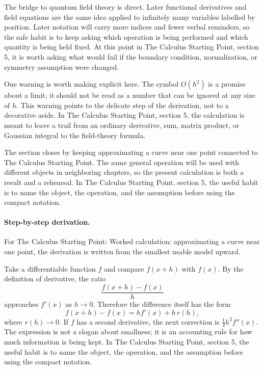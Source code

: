 The bridge to quantum field theory is direct.  Later functional derivatives and field equations are the same idea applied to infinitely many variables labelled by position.  Later notation will carry more indices and fewer verbal reminders, so the safe habit is to keep asking which operation is being performed and which quantity is being held fixed.  At this point in The Calculus Starting Point, section 5, it is worth asking what would fail if the boundary condition, normalization, or symmetry assumption were changed.

One warning is worth making explicit here.  The symbol \(O(h^2)\) is a promise about a limit; it should not be read as a number that can be ignored at any size of \(h\).  This warning points to the delicate step of the derivation, not to a decorative aside.  In The Calculus Starting Point, section 5, the calculation is meant to leave a trail from an ordinary derivative, sum, matrix product, or Gaussian integral to the field-theory formula.

The section closes by keeping approximating a curve near one point connected to The Calculus Starting Point.  The same general operation will be used with different objects in neighboring chapters, so the present calculation is both a result and a rehearsal.  In The Calculus Starting Point, section 5, the useful habit is to name the object, the operation, and the assumption before using the compact notation.



\paragraph{Step-by-step derivation.}

For The Calculus Starting Point: Worked calculation: approximating a curve near one point, the derivation is written from the smallest usable model upward.

Take a differentiable function \(f\) and compare \(f(x+h)\) with \(f(x)\).  By the definition of derivative, the ratio
\[
  \frac{f(x+h)-f(x)}{h}
\]
approaches \(f'(x)\) as \(h\to0\).  Therefore the difference itself has the form
\[
  f(x+h)-f(x)=hf'(x)+h\,r(h),
\]
where \(r(h)\to0\).  If \(f\) has a second derivative, the next correction is \(\frac12h^2f''(x)\).  The expression is not a slogan about smallness; it is an accounting rule for how much information is being kept.  In The Calculus Starting Point, section 5, the useful habit is to name the object, the operation, and the assumption before using the compact notation.

